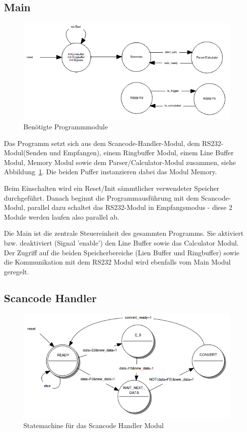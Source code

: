 \subsection{Main}

\begin{figure}[!ht]
	\centering
	\includegraphics[scale=0.5]{figures/mainSM.png} 
	\caption{Benötigte Programmmodule}
	\label{fig:mainSM}
\end{figure}

Das Programm setzt sich aus dem Scancode-Handler-Modul, dem RS232-Modul(Senden und Empfangen), einem Ringbuffer Modul, einem Line Buffer Modul, Memory Modul sowie dem Parser/Calculator-Modul zusammen, siehe Abbildung~\ref{fig:mainSM}. 
Die beiden Puffer instanzieren dabei das Modul Memory.

Beim Einschalten wird ein Reset/Init sämmtlicher verwendeter Speicher durchgeführt. Danach beginnt die Programmausführung mit dem Scancode-Modul, parallel dazu schaltet das RS232-Modul in Empfangsmodus - diese 2 Module werden laufen also parallel ab.

Die Main ist die zentrale Steuereinheit des gesammten Programms. Sie aktiviert bzw. deaktiviert (Signal 'enable') den Line Buffer sowie das Calculator Modul. Der Zugriff auf die beiden Speicherbereiche (Lien Buffer und Ringbuffer) sowie die Kommunikation mit dem RS232 Modul wird ebenfalls vom Main Modul geregelt.


\subsection{Scancode Handler}

\begin{figure}[!ht]
	\centering
	\includegraphics[scale=0.4]{figures/scancode.png} 
	\caption{Statemachine für das Scancode Handler Modul}
	\label{fig:scan}
\end{figure}


